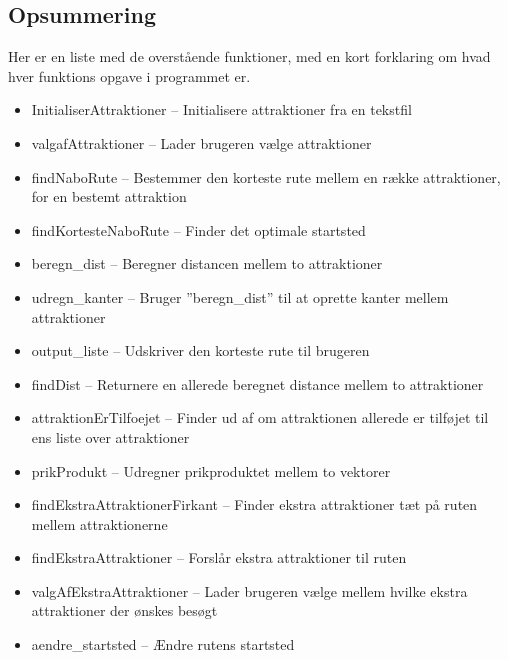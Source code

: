 \subsection{Opsummering}
Her er en liste med de overstående funktioner, med en kort forklaring om hvad hver funktions opgave i programmet er.
\begin{itemize}
	\item InitialiserAttraktioner – Initialisere attraktioner fra en tekstfil
	\item valgafAttraktioner – Lader brugeren vælge attraktioner
	\item findNaboRute – Bestemmer den korteste rute mellem en række attraktioner, for en bestemt attraktion
	\item findKortesteNaboRute – Finder det optimale startsted
	\item beregn\_dist – Beregner distancen mellem to attraktioner
	\item udregn\_kanter – Bruger ”beregn\_dist” til at oprette kanter mellem attraktioner
	\item output\_liste – Udskriver den korteste rute til brugeren
	\item findDist – Returnere en allerede beregnet distance mellem to attraktioner
	\item attraktionErTilfoejet – Finder ud af om attraktionen allerede er tilføjet til ens liste over attraktioner
	\item prikProdukt – Udregner prikproduktet mellem to vektorer
	\item findEkstraAttraktionerFirkant – Finder ekstra attraktioner tæt på ruten mellem attraktionerne
	\item findEkstraAttraktioner – Forslår ekstra attraktioner til ruten
	\item valgAfEkstraAttraktioner – Lader brugeren vælge mellem hvilke ekstra attraktioner der ønskes besøgt
	\item aendre\_startsted – Ændre rutens startsted
\end{itemize}




